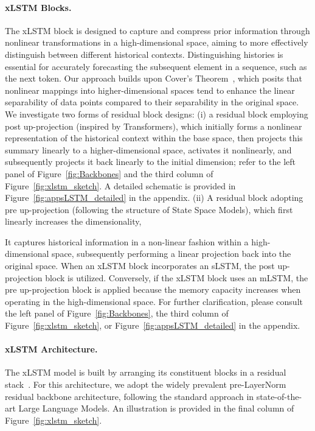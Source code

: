 \paragraph{xLSTM Blocks.}
\label{sec:xLSTMblock}
The xLSTM block is designed to capture and compress prior information through nonlinear transformations in a high-dimensional space, aiming to more effectively distinguish between different historical contexts. Distinguishing histories is essential for accurately forecasting the subsequent element in a sequence, such as the next token. Our approach builds upon Cover’s Theorem~\citep{Cover:65}, which posits that nonlinear mappings into higher-dimensional spaces tend to enhance the linear separability of data points compared to their separability in the original space. We investigate two forms of residual block designs: (i) a residual block employing post up-projection (inspired by Transformers), which initially forms a nonlinear representation of the historical context within the base space, then projects this summary linearly to a higher-dimensional space, activates it nonlinearly, and subsequently projects it back linearly to the initial dimension; refer to the left panel of Figure~\ref{fig:Backbones} and the third column of Figure~\ref{fig:xlstm_sketch}. A detailed schematic is provided in Figure~\ref{fig:appsLSTM_detailed} in the appendix. (ii) A residual block adopting pre up-projection (following the structure of State Space Models), which first linearly increases the dimensionality,

It captures historical information in a non-linear fashion within a high-dimensional space, subsequently performing a linear projection back into the original space. When an xLSTM block incorporates an sLSTM, the post up-projection block is utilized. Conversely, if the xLSTM block uses an mLSTM, the pre up-projection block is applied because the memory capacity increases when operating in the high-dimensional space. For further clarification, please consult the left panel of Figure~\ref{fig:Backbones}, the third column of Figure~\ref{fig:xlstm_sketch}, or Figure~\ref{fig:appsLSTM_detailed} in the appendix.

\paragraph{xLSTM Architecture. }
\label{sec:xLSTMarchitecure}
The xLSTM model is built by arranging its constituent blocks in a residual stack~\citep{Srivastava:15,He:16}. For this architecture, we adopt the widely prevalent pre-LayerNorm~\citep{Ba:16b} residual backbone architecture, following the standard approach in state-of-the-art Large Language Models. An illustration is provided in the final column of Figure~\ref{fig:xlstm_sketch}.


